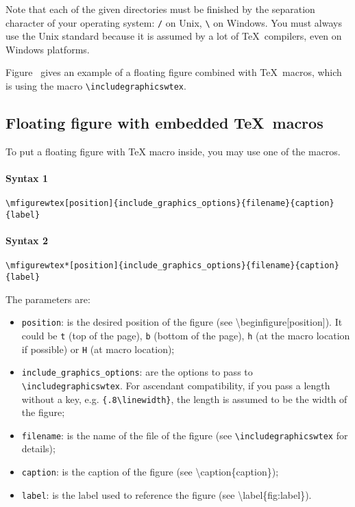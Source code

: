 \documentclass[book,taskpackage,specpackage,codepackage]{upmethodology-document}
\begin{document}
\begin{upminfo}
	Note that each of the given directories must be finished by the separation character of your operating system: \texttt{/} on Unix, \texttt{\textbackslash} on Windows. You must always use the Unix standard because it is assumed by a lot of \TeX\ compilers, even on Windows platforms.
\end{upminfo}

Figure~ gives an example of a floating figure combined with \TeX\ macros, which is using the macro \texttt{{\textbackslash}includegraphicswtex}.

\subsection{Floating figure with embedded \TeX\ macros}

To put a floating figure with \TeX\xspace macro inside, you may use one of the macros.

\paragraph{Syntax 1} \texttt{{\textbackslash}mfigurewtex[position]\{include\_graphics\_options\}\{filename\}\{caption\}\{label\}}

\paragraph{Syntax 2} \texttt{{\textbackslash}mfigurewtex*[position]\{include\_graphics\_options\}\{filename\}\{caption\}\{label\}}

The parameters are:
\begin{itemize}
\item \texttt{position}: is the desired position of the figure (see {\textbackslash}begin{figure}[position]). It could be \texttt{t} (top of the page), \texttt{b} (bottom of the page), \texttt{h} (at the macro location if possible) or \texttt{H} (at macro location);

\item \texttt{include\_graphics\_options}: are the options to pass to \texttt{{\textbackslash}includegraphicswtex}. For ascendant compatibility, if you pass a length without a key, e.g. \texttt{\{.8{\textbackslash}linewidth\}}, the length is assumed to be the width of the figure;

\item \texttt{filename}: is the name of the file of the figure (see \texttt{{\textbackslash}includegraphicswtex} for details);

\item \texttt{caption}: is the caption of the figure (see {\textbackslash}caption\{caption\});

\item \texttt{label}: is the label used to reference the figure (see {\textbackslash}label\{fig:label\}).
\end{itemize}
\end{document}
